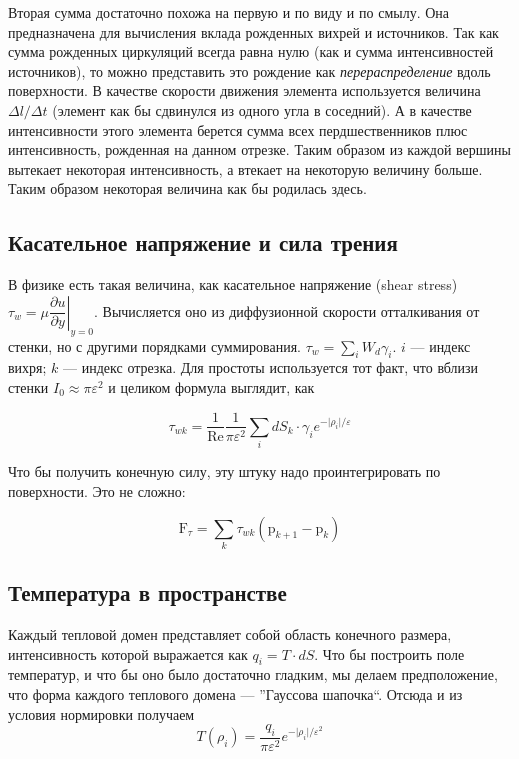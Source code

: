 \documentclass[14pt]{extreport}
\newcommand{\br}[1]{\boldsymbol{\mathrm{#1}}}
\newcommand{\Reyn}{\text{Re}}
\begin{document}
Вторая сумма достаточно похожа на первую и по виду и по смылу. Она предназначена для вычисления вклада рожденных вихрей и источников. Так как сумма рожденных циркуляций всегда равна нулю (как и сумма интенсивностей источников), то можно представить это рождение как \textit{перераспределение} вдоль поверхности. В качестве скорости движения элемента используется величина ${\Delta l}/{\Delta t}$ (элемент как бы сдвинулся из одного угла в соседний). А в качестве интенсивности этого элемента берется сумма всех пердшественников плюс интенсивность, рожденная на данном отрезке.
Таким образом из каждой вершины вытекает некоторая интенсивность, а втекает на некоторую величину больше. Таким образом некоторая величина как бы родилась здесь.

\subsection{Касательное напряжение и сила трения}

В физике есть такая величина, как касательное напряжение (shear stress) $\tau_w = \mu \left. \dfrac{\partial u}{\partial y} \right|_{y=0}$. Вычисляется оно из диффузионной скорости отталкивания от стенки, но с другими порядками суммирования. $ \tau_w = \sum_i {W_d \gamma_i}$. $i$ --- индекс вихря; $k$ --- индекс отрезка. Для простоты используется тот факт, что вблизи стенки $I_0 \approx \pi\varepsilon^2$ и целиком формула выглядит, как

$$ \tau_{wk} = \dfrac{1}{\Reyn}\dfrac{1}{\pi\varepsilon^2} \sum\limits_i dS_k\cdot \gamma_i e^{-\lvert\rho_i\rvert/\varepsilon}$$

Что бы получить конечную силу, эту штуку надо проинтегрировать по поверхности. Это не сложно:

$$ \br F_\tau = \sum_k {\tau_{wk} (\br p_{k+1} - \br p_k) } $$

\subsection{Температура в пространстве}
Каждый тепловой домен представляет собой область конечного размера, интенсивность которой выражается как $q_i = T \cdot dS$. Что бы построить поле температур, и что бы оно было достаточно гладким, мы делаем предположение, что форма каждого теплового домена --- ''Гауссова шапочка``. Отсюда и из условия нормировки получаем
$$T(\rho_i) = \dfrac{q_i}{\pi \varepsilon^2} e^{-\lvert \rho_i \rvert / \varepsilon^2}$$
\end{document}
